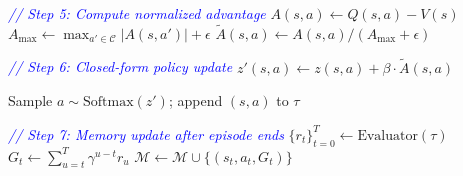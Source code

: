 \begin{algorithm}[h]
\begin{algorithmic}
            \STATE \textcolor{blue}{\textit{// Step 5: Compute normalized advantage}}
                \STATE $A(s,a) \leftarrow Q(s,a) - V(s)$
            \ENDFOR
            \STATE $A_{\max} \leftarrow \max_{a' \in \mathcal{C}}|A(s,a')| + \epsilon$
                \STATE $\tilde{A}(s,a) \leftarrow A(s,a) / (A_{\max}+\epsilon)$
            \ENDFOR

            \STATE \textcolor{blue}{\textit{// Step 6: Closed-form policy update}}
                \STATE $z'(s,a) \leftarrow z(s,a) + \beta \cdot \tilde{A}(s,a)$
            \ENDFOR

            \STATE Sample $a \sim \text{Softmax}(z')$; append $(s, a)$ to $\tau$
        \ENDWHILE

        \STATE \textcolor{blue}{\textit{// Step 7: Memory update after episode ends}}
        \STATE $\{r_t\}_{t=0}^{T} \leftarrow \text{Evaluator}(\tau)$
            \STATE $G_t \leftarrow \sum_{u=t}^{T} \gamma^{u-t} r_u$
            \STATE $\mathcal{M} \leftarrow \mathcal{M} \cup \{(s_t, a_t, G_t)\}$
        \ENDFOR
    \ENDFOR
 \end{algorithmic}
 \end{algorithm}
